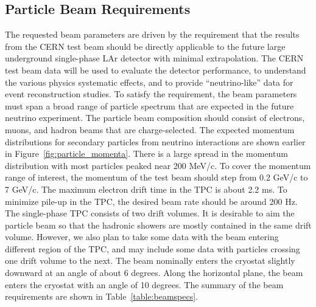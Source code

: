 
\subsection{Particle Beam Requirements}
The requested beam parameters are driven by the requirement that the results from the CERN test beam should be directly applicable to the future large underground single-phase LAr detector with minimal extrapolation. The CERN test beam data will be used to evaluate the detector performance, to understand the various physics systematic effects, and to provide ``neutrino-like'' data for event reconstruction studies. To satisfy the requirement, the beam parameters must span a broad range of particle spectrum that are expected in the future neutrino experiment. The particle beam composition should consist of electrons, muons, and hadron beams that are charge-selected. The expected momentum distributions for secondary particles from neutrino interactions are shown earlier in Figure~\ref{fig:particle_momenta}. There is a large spread in the momentum distribution with most particles peaked near 200 MeV/c. To cover the momentum range of interest, the momentum of the test beam should step from 0.2 GeV/c to 7 GeV/c. The maximum electron drift time in the TPC is about 2.2 ms. To minimize pile-up in the TPC, the desired beam rate should be around 200 Hz. The single-phase TPC consists of two drift volumes. It is desirable to aim the particle beam so that the hadronic showers are mostly contained in the same drift volume.  However, we also plan to take some data with the beam entering different region of the TPC, and may include some data with particles crossing one drift volume to the next. %
The beam nominally enters the cryostat slightly downward at an angle of about 6 degrees. Along the horizontal plane, the beam enters the cryostat with an angle of 10 degrees. The summary of the beam requirements are shown in Table~\ref{table:beamspecs}.

%

